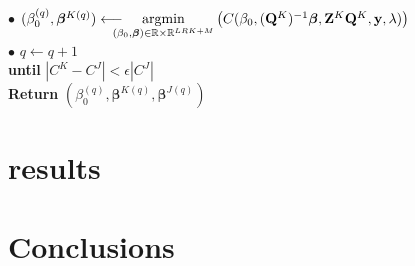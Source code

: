 \documentclass[10pt]{article}
\begin{document}
\begin{mdframed}[leftmargin=0cm, rightmargin=4cm]
\phantom{a}\hspace{25 pt}  $\bullet$ $(\beta_0^{(q)}, \bm{\beta}^{K {(q)}}) \longleftarrow \hspace{-10 pt} \underset{(\beta_0, \bm{\beta}) \in \mathbb{R} \times \mathbb{R}^{LRK + M}}{\text{argmin}} \left( C(\beta_0, (\mathbf{Q}^K)^{-1}\bm{\beta},\mathbf{Z}^K \mathbf{Q}^K, \mathbf{y}, \lambda) \right)$\\[2 pt]
\phantom{a}\hspace{25 pt}  $\bullet$ $q \leftarrow q + 1$\\[4 pt]
\phantom{a}\hspace{8 pt}  \textbf{until} $|C^K - C^J| < \epsilon |C^J| $\\[4 pt]
\textbf{Return} $(\beta_0^{(q)},\bm{\beta}^{K(q)}, \bm{\beta}^{J(q)})$
\end{mdframed}





\vspace{10 pt}













\vspace{2 cm}
 
\section{results}




\section*{Conclusions}
\blindtext








\end{document}
